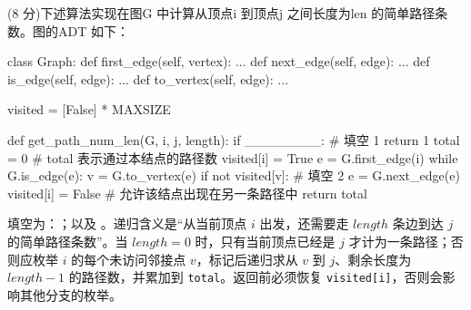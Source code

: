 \begin{question}
(8 分)下述算法实现在图G 中计算从顶点i 到顶点j 之间长度为len 的简单路径条数。图的ADT 如下：
\begin{pycode}
class Graph:
    def first_edge(self, vertex): ...
    def next_edge(self, edge): ...
    def is_edge(self, edge): ...
    def to_vertex(self, edge): ...


visited = [False] * MAXSIZE


def get_path_num_len(G, i, j, length):
    if ________:                # 填空 1
        return 1
    total = 0              # total 表示通过本结点的路径数
    visited[i] = True
    e = G.first_edge(i)
    while G.is_edge(e):
        v = G.to_vertex(e)
        if not visited[v]:
            # 填空 2
        e = G.next_edge(e)
    visited[i] = False     # 允许该结点出现在另一条路径中
    return total
\end{pycode}
\begin{solution}
填空为：\texttt{}；以及 \texttt{}。递归含义是“从当前顶点 $i$ 出发，还需要走 $length$ 条边到达 $j$ 的简单路径条数”。当 $length=0$ 时，只有当前顶点已经是 $j$ 才计为一条路径；否则应枚举 $i$ 的每个未访问邻接点 $v$，标记后递归求从 $v$ 到 $j$、剩余长度为 $length-1$ 的路径数，并累加到 \texttt{total}。返回前必须恢复 \texttt{visited[i]}，否则会影响其他分支的枚举。
\end{solution}
\end{question}

